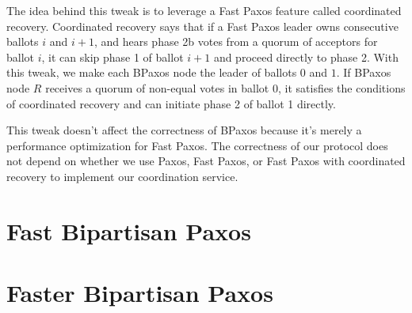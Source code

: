\documentclass{mwhittaker}
\begin{document}
The idea behind this tweak is to leverage a Fast Paxos feature called
coordinated recovery. Coordinated recovery says that if a Fast Paxos leader
owns consecutive ballots $i$ and $i + 1$, and hears phase 2b votes from a
quorum of acceptors for ballot $i$, it can skip phase 1 of ballot $i + 1$ and
proceed directly to phase 2. With this tweak, we make each BPaxos node the
leader of ballots $0$ and $1$. If BPaxos node $R$ receives a quorum of
non-equal votes in ballot $0$, it satisfies the conditions of coordinated
recovery and can initiate phase 2 of ballot 1 directly.

This tweak doesn't affect the correctness of BPaxos because it's merely a
performance optimization for Fast Paxos. The correctness of our protocol does
not depend on whether we use Paxos, Fast Paxos, or Fast Paxos with coordinated
recovery to implement our coordination service.

\section{Fast Bipartisan Paxos}
\section{Faster Bipartisan Paxos}



\end{document}
